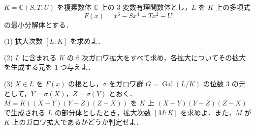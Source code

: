 \documentclass[12pt]{jlreq}
\newcommand{\C}{\mathbb{C}}
\begin{document}
\(K = \C(S, T, U)\) を複素数体 \(\C\) 上の \(3\) 変数有理関数体とし，\(L\) を \(K\) 上の多項式
\[
  F(x) = x^6 - Sx^4 + Tx^2 - U
\]
の最小分解体とする．

(1) 拡大次数 \([L : K]\) を求めよ．

(2) \(L\) に含まれる \(K\) の \(6\) 次ガロワ拡大をすべて求め，各拡大についてその拡大を生成する元を \(1\) つ与えよ．

(3) \(X \in L\) を \(F(x)\) の根とし，\(\sigma\) をガロワ群 \(G = \operatorname{Gal}(L/K)\) の位数 \(3\) の元として，\(Y = \sigma(X)\)，\(Z = \sigma(Y)\) とおく．\(M = K((X-Y)(Y-Z)(Z-X))\) を \(K\) 上 \((X-Y)(Y-Z)(Z-X)\) で生成される \(L\) の部分体としたとき，拡大次数 \([M : K]\) を求めよ．また，\(M\) が \(K\) 上のガロワ拡大であるかどうか判定せよ．
\end{document}
